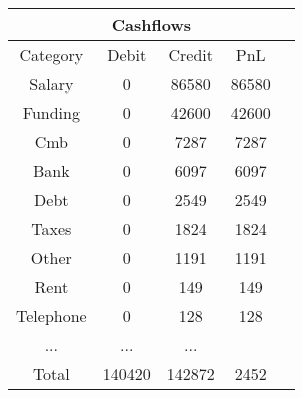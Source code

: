 \begin{longtable}{|c|c|c|c|c|}
\hline
\multicolumn{5}{|c|}{Cashflows} \\
\hline
Category & Debit & Credit & PnL \\
\hline
Salary & 0 & 86580 & 86580\\
\hline
Funding & 0 & 42600 & 42600\\
\hline
Cmb & 0 & 7287 & 7287\\
\hline
Bank & 0 & 6097 & 6097\\
\hline
Debt & 0 & 2549 & 2549\\
\hline
Taxes & 0 & 1824 & 1824\\
\hline
Other & 0 & 1191 & 1191\\
\hline
Rent & 0 & 149 & 149\\
\hline
Telephone & 0 & 128 & 128\\
\hline
 ... & ... & ...\\
\hline
 Total & 140420 & 142872 & 2452 \\
\hline
\end{longtable}
